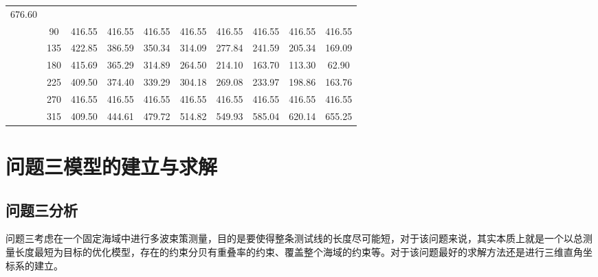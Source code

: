 \documentclass[12pt,a4paper]{article}
\begin{document}
\begin{table}[H]
\begin{tabular}{|cc|cccccccc|}
		676.60 \\ \cline{2-10} 
		\multicolumn{1}{|c|}{} &
		90 &
		\multicolumn{1}{c|}{416.55} &
		\multicolumn{1}{c|}{416.55} &
		\multicolumn{1}{c|}{416.55} &
		\multicolumn{1}{c|}{416.55} &
		\multicolumn{1}{c|}{416.55} &
		\multicolumn{1}{c|}{416.55} &
		\multicolumn{1}{c|}{416.55} &
		416.55 \\ \cline{2-10} 
		\multicolumn{1}{|c|}{} &
		135 &
		\multicolumn{1}{c|}{422.85} &
		\multicolumn{1}{c|}{386.59} &
		\multicolumn{1}{c|}{350.34} &
		\multicolumn{1}{c|}{314.09} &
		\multicolumn{1}{c|}{277.84} &
		\multicolumn{1}{c|}{241.59} &
		\multicolumn{1}{c|}{205.34} &
		169.09 \\ \cline{2-10} 
		\multicolumn{1}{|c|}{} &
		180 &
		\multicolumn{1}{c|}{415.69} &
		\multicolumn{1}{c|}{365.29} &
		\multicolumn{1}{c|}{314.89} &
		\multicolumn{1}{c|}{264.50} &
		\multicolumn{1}{c|}{214.10} &
		\multicolumn{1}{c|}{163.70} &
		\multicolumn{1}{c|}{113.30} &
		62.90 \\ \cline{2-10} 
		\multicolumn{1}{|c|}{} &
		225 &
		\multicolumn{1}{c|}{409.50} &
		\multicolumn{1}{c|}{374.40} &
		\multicolumn{1}{c|}{339.29} &
		\multicolumn{1}{c|}{304.18} &
		\multicolumn{1}{c|}{269.08} &
		\multicolumn{1}{c|}{233.97} &
		\multicolumn{1}{c|}{198.86} &
		163.76 \\ \cline{2-10} 
		\multicolumn{1}{|c|}{} &
		270 &
		\multicolumn{1}{c|}{416.55} &
		\multicolumn{1}{c|}{416.55} &
		\multicolumn{1}{c|}{416.55} &
		\multicolumn{1}{c|}{416.55} &
		\multicolumn{1}{c|}{416.55} &
		\multicolumn{1}{c|}{416.55} &
		\multicolumn{1}{c|}{416.55} &
		416.55 \\ \cline{2-10} 
		\multicolumn{1}{|c|}{} &
		315 &
		\multicolumn{1}{c|}{409.50} &
		\multicolumn{1}{c|}{444.61} &
		\multicolumn{1}{c|}{479.72} &
		\multicolumn{1}{c|}{514.82} &
		\multicolumn{1}{c|}{549.93} &
		\multicolumn{1}{c|}{585.04} &
		\multicolumn{1}{c|}{620.14} &
		655.25 \\ \hline
	\end{tabular}
\end{table}


\section{问题三模型的建立与求解}
\subsection{问题三分析}
问题三考虑在一个固定海域中进行多波束策测量，目的是要使得整条测试线的长度尽可能短，对于该问题来说，其实本质上就是一个以总测量长度最短为目标的优化模型，存在的约束分贝有重叠率的约束、覆盖整个海域的约束等。对于该问题最好的求解方法还是进行三维直角坐标系的建立。
\end{document}
